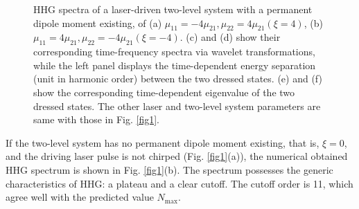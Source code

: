 \documentclass[10pt,letterpaper]{article}
\begin{document}
\begin{figure}[h]
	\hspace{-0.25in}
	\hspace{-0.05in}
	\caption{HHG spectra of a laser-driven two-level system with a permanent dipole moment existing, of (a) $\mu_{11}=-4\mu_{21},\mu_{22}=4\mu_{21} (\xi=4)$, (b) $\mu_{11}=4\mu_{21},\mu_{22}=-4\mu_{21} (\xi=-4)$. (c) and (d) show their corresponding time-frequency spectra via wavelet transformations, while the left panel displays the time-dependent energy separation (unit in harmonic order) between the two dressed states. (e) and (f) show the corresponding time-dependent eigenvalue of the two dressed states. The other laser and two-level system parameters are same with those in Fig. \ref{fig1}.}
	\label{fig2}
\end{figure}
If the two-level system has no permanent dipole moment existing, that is, $\xi=0$, and the driving laser pulse is not chirped (Fig. \ref{fig1}(a)), the numerical obtained HHG spectrum is shown in Fig. \ref{fig1}(b). The spectrum possesses the generic characteristics of HHG: a plateau and a clear cutoff. The cutoff order is 11, which agree well with the predicted value $N_{\textrm{max}}$.
\end{document}
